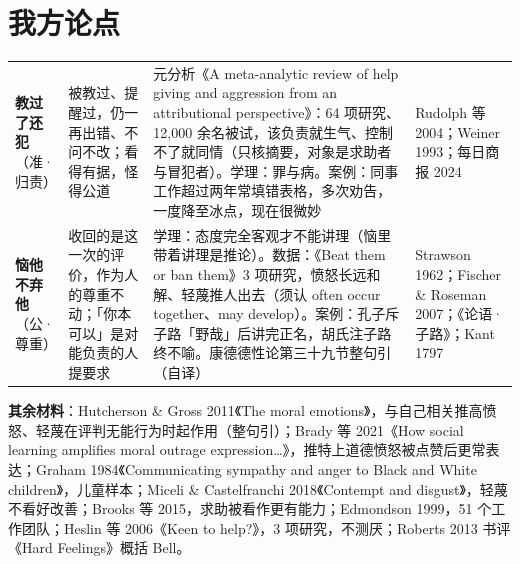 \documentclass[quick,con]{debate}
\begin{document}
\section{我方论点}
\begin{tabularx}{\linewidth}{@{}L{4.6em}L{8em}Y L{6.4em}@{}}\toprule
{}&&&\\\midrule
\textbf{教过了还犯}（准·归责）&被教过、提醒过，仍一再出错、不问不改；看得有据，怪得公道&元分析《A meta-analytic review of help giving and aggression from an attributional perspective》：64 项研究、12,000 余名被试，该负责就生气、控制不了就同情（只核摘要，对象是求助者与冒犯者）。学理：罪与病。案例：同事工作超过两年常填错表格，多次劝告，一度降至冰点，现在很微妙&Rudolph 等 2004；Weiner 1993；每日商报 2024\\
\textbf{恼他不弃他}（公·尊重）&收回的是这一次的评价，作为人的尊重不动；「你本可以」是对能负责的人提要求&学理：态度完全客观才不能讲理（恼里带着讲理是推论）。数据：《Beat them or ban them》3 项研究，愤怒长远和解、轻蔑推人出去（须认 often occur together、may develop）。案例：孔子斥子路「野哉」后讲完正名，胡氏注子路终不喻。康德德性论第三十九节整句引（自译）&Strawson 1962；Fischer \& Roseman 2007；《论语·子路》；Kant 1797\\
\bottomrule\end{tabularx}
\textbf{其余材料}：Hutcherson \& Gross 2011《The moral emotions》，与自己相关推高愤怒、轻蔑在评判无能行为时起作用（整句引）；Brady 等 2021《How social learning amplifies moral outrage expression…》，推特上道德愤怒被点赞后更常表达；Graham 1984《Communicating sympathy and anger to Black and White children》，儿童样本；Miceli \& Castelfranchi 2018《Contempt and disgust》，轻蔑不看好改善；Brooks 等 2015，求助被看作更有能力；Edmondson 1999，51 个工作团队；Heslin 等 2006《Keen to help?》，3 项研究，不测厌；Roberts 2013 书评《Hard Feelings》概括 Bell。
\end{document}
